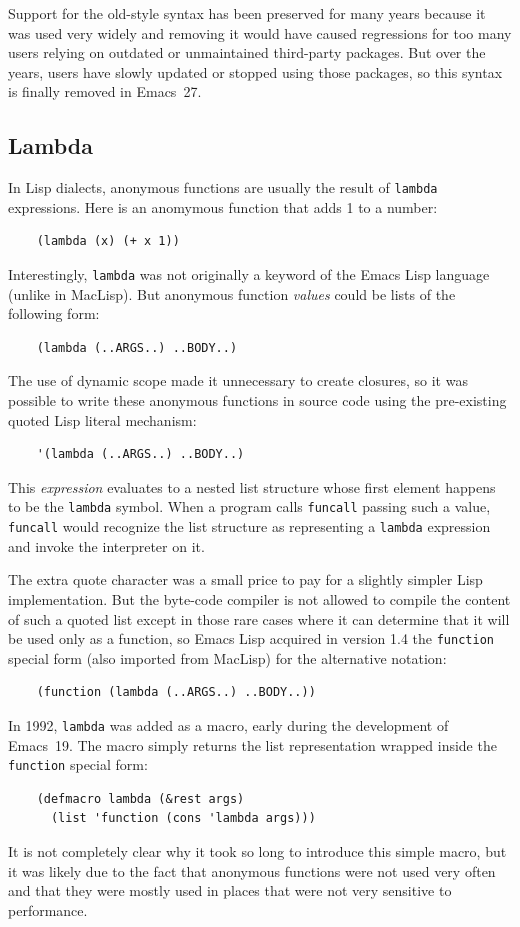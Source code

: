 \documentclass[format=acmsmall,screen]{acmart}
\newcommand \Elisp {Emacs Lisp}
\begin{document}
Support for the old-style syntax has been preserved for many years because
it was used very widely and removing it would have caused regressions for
too many users relying on outdated or unmaintained third-party packages.
But over the years, users have slowly updated or stopped using those
packages, so this syntax is finally removed in Emacs~27.

\subsection{Lambda}
\label{sec:lambda}

In Lisp dialects, anonymous functions are usually the result of
\texttt{lambda} expressions.  Here is an anomymous function that adds
1 to a number:
%
\begin{verbatim}
    (lambda (x) (+ x 1))
\end{verbatim}
%
Interestingly, \texttt{lambda} was not originally a keyword of the
\Elisp{} language (unlike in MacLisp).  But anonymous
function \emph{values} could be lists of the following form:
%
\begin{verbatim}
    (lambda (..ARGS..) ..BODY..)
\end{verbatim}
%
The use of dynamic scope made it unnecessary to create closures, so it was
possible to write these anonymous functions in source code using the
pre-existing quoted Lisp literal mechanism:
%
\begin{verbatim}
    '(lambda (..ARGS..) ..BODY..)
\end{verbatim}
%
This \emph{expression} evaluates to a nested list structure whose first
element happens to be the \texttt{lambda} symbol.  When a program calls
\texttt{funcall} passing such a value, \texttt{funcall} would
recognize the list structure as representing a \texttt{lambda}
expression and invoke the interpreter on it.

The extra quote character was a small price to pay for a slightly simpler
Lisp implementation.  But the byte-code compiler is not allowed to compile the
content of such a quoted list except in those rare cases where it can
determine that it will be used only as a function, so \Elisp{} acquired in
version 1.4 the \texttt{function} special form (also imported from MacLisp)
for the alternative notation:
%
\begin{verbatim}
    (function (lambda (..ARGS..) ..BODY..))
\end{verbatim}
%
In 1992, \texttt{lambda} was added as a macro, early during the
development of Emacs~19.  The macro simply returns the list representation
wrapped inside the \texttt{function} special form:
\begin{verbatim}
    (defmacro lambda (&rest args)
      (list 'function (cons 'lambda args)))
\end{verbatim}
It is not completely
clear why it took so long to introduce this simple macro, but it was likely
due to the fact that anonymous functions were not used very often and that
they were mostly used in places that were not very sensitive to performance.
\end{document}
